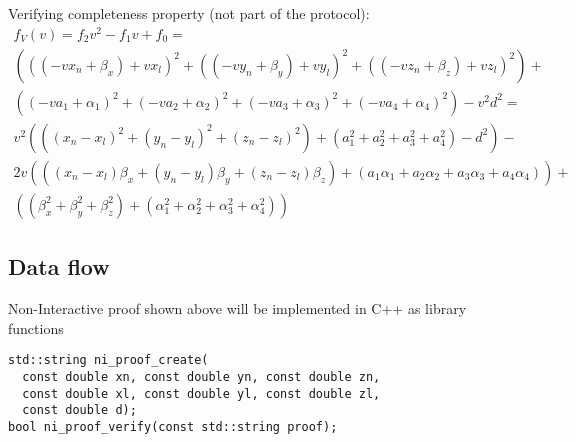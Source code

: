 \documentclass[a4paper,12pt]{article}
\begin{document}
Verifying completeness property (not part of the protocol):
\begin{multline}
  f_V(v) = f_2 v^2 - f_1 v + f_0 = \\
  (((-v x_n + \beta_x) + v x_l)^2 +
   ((-v y_n + \beta_y) + v y_l)^2 +
   ((-v z_n + \beta_z) + v z_l)^2) +  \\
  ((-v a_1 + \alpha_1)^2 +
   (-v a_2 + \alpha_2)^2 +
   (-v a_3 + \alpha_3)^2 +
   (-v a_4 + \alpha_4)^2) - v^2 d^2  = \\
  v^2 (((x_n - x_l)^2 + (y_n - y_l)^2 + (z_n - z_l)^2) + (a_1^2 + a_2^2 + a_3^2 + a_4^2) - d^2) - \\
  2 v (((x_n - x_l) \beta_x + (y_n - y_l) \beta_y + (z_n - z_l) \beta_z) + (a_1 \alpha_1 + a_2 \alpha_2 + a_3 \alpha_3 + a_4 \alpha_4)) + \\
  ((\beta_x^2 + \beta_y^2 + \beta_z^2) + (\alpha_1^2 + \alpha_2^2 + \alpha_3^2 + \alpha_4^2))
\end{multline}

\subsection{Data flow}

Non-Interactive proof shown above will be implemented in C++ as library functions
\begin{verbatim}
std::string ni_proof_create(
  const double xn, const double yn, const double zn,
  const double xl, const double yl, const double zl,
  const double d);
bool ni_proof_verify(const std::string proof);
\end{verbatim}
\end{document}
